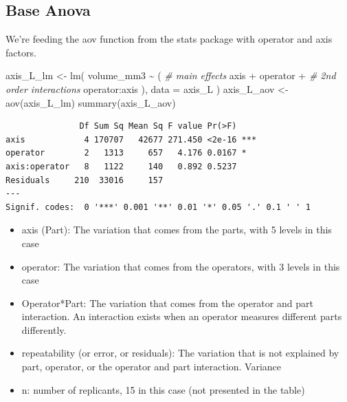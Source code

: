 \documentclass[
]{book}
\newenvironment{Shaded}{\begin{snugshade}}{\end{snugshade}}
\newcommand{\AttributeTok}[1]{\textcolor[rgb]{0.77,0.63,0.00}{#1}}
\newcommand{\CommentTok}[1]{\textcolor[rgb]{0.56,0.35,0.01}{\textit{#1}}}
\newcommand{\FunctionTok}[1]{\textcolor[rgb]{0.00,0.00,0.00}{#1}}
\newcommand{\NormalTok}[1]{#1}
\newcommand{\OtherTok}[1]{\textcolor[rgb]{0.56,0.35,0.01}{#1}}
\newcommand{\SpecialCharTok}[1]{\textcolor[rgb]{0.00,0.00,0.00}{#1}}
\providecommand{\tightlist}{%
  \setlength{\itemsep}{0pt}\setlength{\parskip}{0pt}}
\begin{document}
\hypertarget{base-anova}{%
\subsection{Base Anova}\label{base-anova}}

We're feeding the aov function from the stats package with operator and axis factors.

\begin{Shaded}
\begin{Highlighting}[]
\NormalTok{axis\_L\_lm }\OtherTok{\textless{}{-}} \FunctionTok{lm}\NormalTok{(}
\NormalTok{  volume\_mm3 }\SpecialCharTok{\textasciitilde{}}\NormalTok{ (}
    \CommentTok{\# main effects}
\NormalTok{    axis }\SpecialCharTok{+}
\NormalTok{    operator }\SpecialCharTok{+}
    \CommentTok{\# 2nd order interactions}
\NormalTok{    operator}\SpecialCharTok{:}\NormalTok{axis}
\NormalTok{    ),}
    \AttributeTok{data =}\NormalTok{ axis\_L}
\NormalTok{)}
\NormalTok{axis\_L\_aov }\OtherTok{\textless{}{-}} \FunctionTok{aov}\NormalTok{(axis\_L\_lm)}
\FunctionTok{summary}\NormalTok{(axis\_L\_aov)}
\end{Highlighting}
\end{Shaded}

\begin{verbatim}
               Df Sum Sq Mean Sq F value Pr(>F)    
axis            4 170707   42677 271.450 <2e-16 ***
operator        2   1313     657   4.176 0.0167 *  
axis:operator   8   1122     140   0.892 0.5237    
Residuals     210  33016     157                   
---
Signif. codes:  0 '***' 0.001 '**' 0.01 '*' 0.05 '.' 0.1 ' ' 1
\end{verbatim}

\begin{itemize}
\tightlist
\item
  axis (Part): The variation that comes from the parts, with 5 levels in this case
\item
  operator: The variation that comes from the operators, with 3 levels in this case
\item
  Operator*Part: The variation that comes from the operator and part interaction. An interaction exists when an operator measures different parts differently.
\item
  repeatability (or error, or residuals): The variation that is not explained by part, operator, or the operator and part interaction.
  Variance
\item
  n: number of replicants, 15 in this case (not presented in the table)
\end{itemize}
\end{document}
